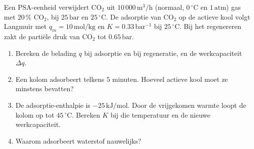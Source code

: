 \begin{oefening}
Een PSA-eenheid verwijdert CO\(_2\) uit \(10\,000\,\mathrm{m^3/h}\) (normaal, \(0\,^\circ\mathrm{C}\) en \(1\,\mathrm{atm}\)) gas met \(20\,\%\) CO\(_2\), bij \(25\,\mathrm{bar}\) en \(25\,^\circ\mathrm{C}\). De adsorptie van CO\(_2\) op de actieve kool volgt Langmuir met \(q_m = 10\,\mathrm{mol/kg}\) en \(K = 0.33\,\mathrm{bar^{-1}}\) bij \(25\,^\circ\mathrm{C}\). Bij het regenereren zakt de partiële druk van CO\(_2\) tot \(0.65\,\mathrm{bar}\).

\begin{enumerate}
\item[(a)]
  Bereken de belading \(q\) bij adsorptie en bij regeneratie, en de werkcapaciteit \(\Delta q\).
\item[(b)]
  Een kolom adsorbeert telkens \(5\) minuten. Hoeveel actieve kool moet ze minstens bevatten?
\item[(c)]
  De adsorptie-enthalpie is \(-25\,\mathrm{kJ/mol}\). Door de vrijgekomen warmte loopt de kolom op tot \(45\,^\circ\mathrm{C}\). Bereken \(K\) bij die temperatuur en de nieuwe werkcapaciteit.
\item[(d)]
  Waarom adsorbeert waterstof nauwelijks?
\end{enumerate}
\end{oefening}
